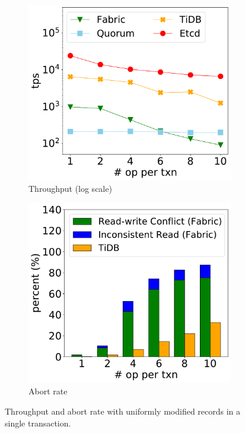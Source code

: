 \begin{figure}[tp]
	\centering
	\begin{subfigure}{0.45\textwidth}
		\includegraphics[width=0.99\textwidth]{chart/twin/txn-size.pdf}
		\caption{Throughput (log scale)}        
		\label{chart:twin:txn-size}
	\end{subfigure}
	\begin{subfigure}{0.45\textwidth}
		\includegraphics[width=0.99\textwidth]{chart/twin/txn-size-abort.pdf}
        \caption{Abort rate}
		\label{chart:twin:txn-size-abort}
	\end{subfigure}
	\caption{Throughput and abort rate with uniformly modified records in a single
	transaction.}
	\label{chart:twin:txn-size-fig}
\end{figure}

